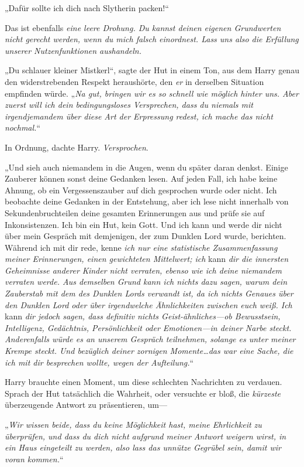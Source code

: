 {„Dafür sollte ich dich nach Slytherin packen!“

Das ist ebenfalls \emph{eine leere Drohung. Du kannst deinen eigenen Grundwerten nicht gerecht werden, wenn du mich falsch einordnest. Lass uns also die Erfüllung unserer Nutzenfunktionen aushandeln.}

„Du schlauer kleiner Mistkerl“, sagte der Hut in einem Ton, aus dem Harry genau den widerstrebenden Respekt heraushörte, den \emph{er} in derselben Situation empfinden würde. „\emph{Na gut, bringen wir es so schnell wie möglich hinter uns. Aber zuerst will ich dein bedingungsloses Versprechen, dass du niemals mit irgendjemandem über diese Art der Erpressung redest, ich mache das nicht nochmal.}“

In Ordnung, dachte Harry. \emph{Versprochen}.

„Und sieh auch niemandem in die Augen, wenn du später daran denkst. Einige Zauberer können sonst deine Gedanken lesen. Auf jeden Fall, ich habe keine Ahnung, ob ein Vergessenszauber auf dich gesprochen wurde oder nicht. Ich beobachte deine Gedanken in der Entstehung, aber ich lese nicht innerhalb von Sekundenbruchteilen deine gesamten Erinnerungen aus und prüfe sie auf Inkonsistenzen. Ich bin ein Hut, kein Gott. Und ich kann und werde dir nicht über mein Gespräch mit demjenigen, der zum Dunklen Lord wurde, berichten. Während ich mit dir rede, kenne \emph{ich nur eine statistische Zusammenfassung meiner Erinnerungen, einen gewichteten Mittelwert; ich} kann \emph{dir die innersten Geheimnisse anderer Kinder nicht verraten, ebenso wie ich deine niemandem verraten werde. Aus demselben Grund kann ich nichts dazu sagen, warum dein Zauberstab mit dem des Dunklen Lords verwandt ist, da ich nichts Genaues über den Dunklen Lord oder über irgendwelche Ähnlichkeiten zwischen euch weiß. Ich} kann \emph{dir jedoch sagen, dass definitiv nichts Geist-ähnliches—ob Bewusstsein, Intelligenz, Gedächtnis, Persönlichkeit oder Emotionen—in deiner Narbe steckt. Anderenfalls würde es an unserem Gespräch teilnehmen, solange es unter meiner Krempe steckt. Und bezüglich deiner zornigen Momente…das war eine Sache, die ich mit dir besprechen wollte, wegen der Aufteilung.}“

Harry brauchte einen Moment, um diese schlechten Nachrichten zu verdauen. Sprach der Hut tatsächlich die Wahrheit, oder versuchte er bloß, die \emph{kürzeste} überzeugende Antwort zu präsentieren, um—

„\emph{Wir wissen beide, dass du keine Möglichkeit hast, meine Ehrlichkeit zu überprüfen, und dass du dich nicht aufgrund meiner Antwort weigern wirst, in ein Haus eingeteilt zu werden, also lass das unnütze Gegrübel sein, damit wir voran kommen.}“

}
